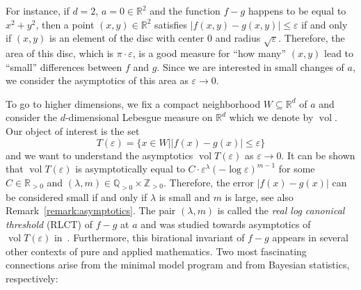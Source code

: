 \documentclass[11pt]{amsart}
\numberwithin{equation}{section}
\theoremstyle{plain}
\theoremstyle{definition}
\newcommand{\Z}{\mathbb{Z}}
\newcommand{\R}{\mathbb{R}}
\newcommand{\Q}{\mathbb{Q}}
\newcommand{\gt}{>}
\begin{document}
For instance, if $d = 2$, $a = 0 \in \R^2$ and the function $f-g$ happens to be equal to $x^2 + y^2$, then a point $(x,y) \in \R^2$ satisfies $\vert f(x,y) - g(x,y) \vert \leq \varepsilon$ if and only if $(x,y)$ is an element of the disc with center $0$ and radius $\sqrt{\varepsilon}$. Therefore, the area of this disc, which is $\pi\cdot \varepsilon$, is a good measure for ``how many'' $(x,y)$ lead to ``small'' differences between $f$ and $g$. Since we are interested in small changes of $a$, we consider the asymptotics of this area as $\varepsilon \to 0$.

To go to higher dimensions, we fix a compact neighborhood $W \subseteq \R^d$ of $a$ and consider the $d$-dimensional Lebesgue measure on $\R^d$ which we denote by $\operatorname{vol}$. Our object of interest is the set
\[
T(\varepsilon) = \{x \in W \mid \vert f(x) - g(x)\vert \leq \varepsilon\}
\]
and we want to understand the asymptotics $\operatorname{vol} T(\varepsilon)$ as $\varepsilon \to 0$. It can be shown that $\operatorname{vol} T(\varepsilon)$ is asymptotically equal
to $C \cdot \varepsilon^\lambda (-\log \varepsilon)^{m-1}$ for some $C \in \R_{\gt 0}$ and $(\lambda,m) \in \Q_{\gt 0} \times \Z_{\gt 0}$. Therefore, the error $ \vert f(x) - g(x)\vert $ can be considered small if and only if $\lambda$ is small and $m$ is large, see also Remark~\ref{remark:asymptotics}. The pair $(\lambda,m)$ is called the \emph{real log canonical threshold} (RLCT) of $f-g$ at $a$ and was studied towards asymptotics of $\operatorname{vol} T(\varepsilon)$ in~\cite{Lin:tubes}.  Furthermore, this birational invariant of $f-g$ appears in several other contexts of pure and applied mathematics. Two most fascinating connections arise from the minimal model program and from Bayesian statistics, respectively: 
\end{document}
